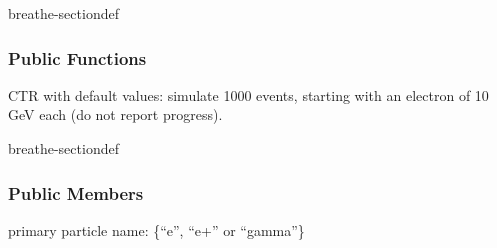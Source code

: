 \documentclass[letterpaper,10pt,english]{sphinxmanual}
\begin{document}
\begin{fulllineitems}
\begin{fulllineitems}
\begin{sphinxuseclass}{breathe-sectiondef}\subsubsection*{Public Functions}

\begin{fulllineitems}
\label{\detokenize{Simulation/SimulationCodeDoc:_CPPv4N15InputParameters16PrimaryAndEvents16PrimaryAndEventsEv}}
\pysigstartsignatures
\pysigstartmultiline
{}
\pysigstopmultiline
\pysigstopsignatures
\sphinxAtStartPar
CTR with default values: simulate 1000 events, starting with an electron of 10 GeV each (do not report progress). 

\end{fulllineitems}


\end{sphinxuseclass}
\begin{sphinxuseclass}{breathe-sectiondef}\subsubsection*{Public Members}

\begin{fulllineitems}
\label{\detokenize{Simulation/SimulationCodeDoc:_CPPv4N15InputParameters16PrimaryAndEvents13fParticleNameE}}
\pysigstartsignatures
\pysigstartmultiline
{}
\pysigstopmultiline
\pysigstopsignatures
\sphinxAtStartPar
primary particle name: \{“e\sphinxhyphen{}”, “e+” or “gamma”\} 

\end{fulllineitems}


\end{sphinxuseclass}
\end{fulllineitems}
\end{fulllineitems}
\end{document}

